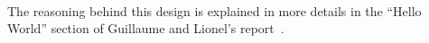 \paragraph{} The reasoning behind this design is explained in more details in the \enquote{Hello 
World} section of Guillaume and Lionel's report~\cite{kotlin_scalajs_report}.

\begin{comment}
  - talk about kotlin representation ?
  - project organization (folders) --> README ?
  - general design of the compiler
  - supported kotlin + scalajs versions
  Annexes
  - brief explanation of the various utils available
  - definition of dispatch receiver, extension receiver
  - kotlin standard library compilation (which files and how)
\end{comment}